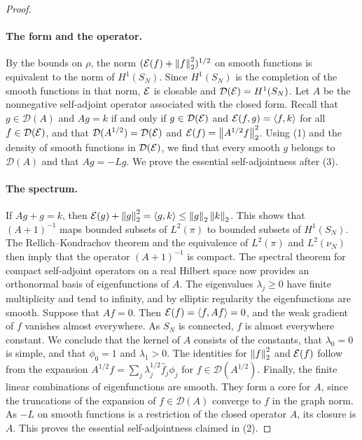 \begin{proof}
\paragraph{The form and the operator.} By the bounds on $\rho$, the norm $(\mathcal E(f)+\left\lVert f\right\rVert_2^2)^{1/2}$ on smooth functions is equivalent to the norm of $H^1(S_N)$. Since $H^1(S_N)$ is the completion of the smooth functions in that norm, $\mathcal E$ is closable and $\mathcal D(\mathcal E)=H^1(S_N)$. Let $A$ be the nonnegative self-adjoint operator associated with the closed form. Recall that $g\in\mathcal D(A)$ and $Ag=k$ if and only if $g\in\mathcal D(\mathcal E)$ and $\mathcal E(f,g)=\langle f,k\rangle$ for all $f\in\mathcal D(\mathcal E)$, and that $\mathcal D(A^{1/2})=\mathcal D(\mathcal E)$ and $\mathcal E(f)=\left\lVert A^{1/2}f\right\rVert_2^2$. Using (1) and the density of smooth functions in $\mathcal D(\mathcal E)$, we find that every smooth $g$ belongs to $\mathcal D(A)$ and that $Ag=-Lg$. We prove the essential self-adjointness after (3).

\paragraph{The spectrum.} If $Ag+g=k$, then $\mathcal E(g)+\left\lVert g\right\rVert_2^2=\langle g,k\rangle\le\left\lVert g\right\rVert_2\left\lVert k\right\rVert_2$. This shows that $(A+1)^{-1}$ maps bounded subsets of $L^2(\pi)$ to bounded subsets of $H^1(S_N)$. The Rellich--Kondrachov theorem and the equivalence of $L^2(\pi)$ and $L^2(\nu_N)$ then imply that the operator $(A+1)^{-1}$ is compact. The spectral theorem for compact self-adjoint operators on a real Hilbert space now provides an orthonormal basis of eigenfunctions of $A$. The eigenvalues $\lambda_j\ge0$ have finite multiplicity and tend to infinity, and by elliptic regularity the eigenfunctions are smooth. Suppose that $Af=0$. Then $\mathcal E(f)=\langle f,Af\rangle=0$, and the weak gradient of $f$ vanishes almost everywhere. As $S_N$ is connected, $f$ is almost everywhere constant. We conclude that the kernel of $A$ consists of the constants, that $\lambda_0=0$ is simple, and that $\phi_0=1$ and $\lambda_1>0$. The identities for $\left\lVert f\right\rVert_2^2$ and $\mathcal E(f)$ follow from the expansion $A^{1/2}f=\sum_j\lambda_j^{1/2}\hat f_j\phi_j$ for $f\in\mathcal D(A^{1/2})$. Finally, the finite linear combinations of eigenfunctions are smooth. They form a core for $A$, since the truncations of the expansion of $f\in\mathcal D(A)$ converge to $f$ in the graph norm. As $-L$ on smooth functions is a restriction of the closed operator $A$, its closure is $A$. This proves the essential self-adjointness claimed in (2).


\end{proof}
